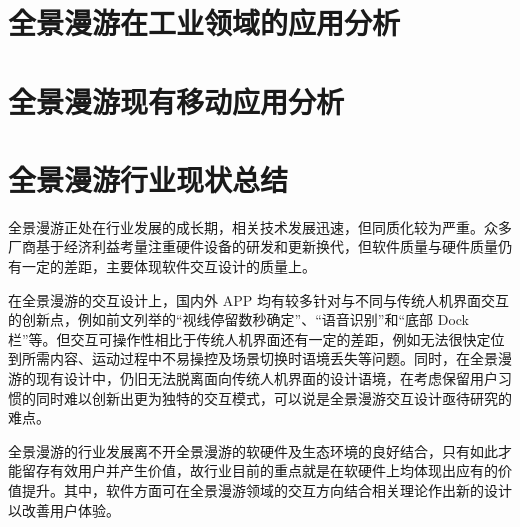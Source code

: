\section{全景漫游在工业领域的应用分析}


\section{全景漫游现有移动应用分析}


\section{全景漫游行业现状总结}

全景漫游正处在行业发展的成长期，相关技术发展迅速，但同质化较为严重。众多厂商基于经济利益考量注重硬件设备的研发和更新换代，但软件质量与硬件质量仍有一定的差距，主要体现软件交互设计的质量上。

在全景漫游的交互设计上，国内外 APP 均有较多针对与不同与传统人机界面交互的创新点，例如前文列举的“视线停留数秒确定”、“语音识别”和“底部 Dock 栏”等。但交互可操作性相比于传统人机界面还有一定的差距，例如无法很快定位到所需内容、运动过程中不易操控及场景切换时语境丢失等问题。同时，在全景漫游的现有设计中，仍旧无法脱离面向传统人机界面的设计语境，在考虑保留用户习惯的同时难以创新出更为独特的交互模式，可以说是全景漫游交互设计亟待研究的难点。

全景漫游的行业发展离不开全景漫游的软硬件及生态环境的良好结合，只有如此才能留存有效用户并产生价值，故行业目前的重点就是在软硬件上均体现出应有的价值提升。其中，软件方面可在全景漫游领域的交互方向结合相关理论作出新的设计以改善用户体验。
